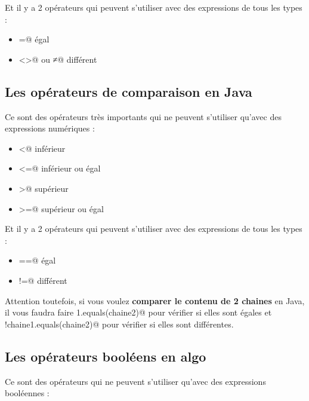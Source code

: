 \documentclass[11pt,a4paper]{article}
\begin{document}
          Et il y a 2 op\'erateurs qui peuvent s'utiliser avec des expressions de tous les types :
          
					\begin{itemize}
				
			\item \verb@=@ \'egal 
			\item \verb@<>@ ou \verb@≠@ diff\'erent 
					\end{itemize}
				
            \par
        \subsection{Les op\'erateurs de comparaison en Java}
          Ce sont des op\'erateurs tr\`es importants qui ne peuvent s'utiliser qu'avec des expressions num\'eriques :
          
					\begin{itemize}
				
			\item \verb@<@ inf\'erieur 
			\item \verb@<=@ inf\'erieur ou \'egal 
			\item \verb@>@ sup\'erieur 
			\item \verb@>=@ sup\'erieur ou \'egal 
					\end{itemize}
				
          Et il y a 2 op\'erateurs qui peuvent s'utiliser avec des expressions de tous les types :
          
					\begin{itemize}
				
			\item \verb@==@ \'egal 
			\item \verb@!=@ diff\'erent 
					\end{itemize}
				
            \par
        
          Attention toutefois, si vous voulez \textbf{comparer le contenu de 2 chaines} en Java,
          il vous faudra faire \verb@chaine1.equals(chaine2)@
          pour v\'erifier si elles sont \'egales et \verb@!chaine1.equals(chaine2)@
          pour v\'erifier si elles sont diff\'erentes.
        
            \par
        \subsection{Les op\'erateurs bool\'eens en algo}
          Ce sont des op\'erateurs qui ne peuvent s'utiliser qu'avec des expressions bool\'eennes :
          
\end{document}
